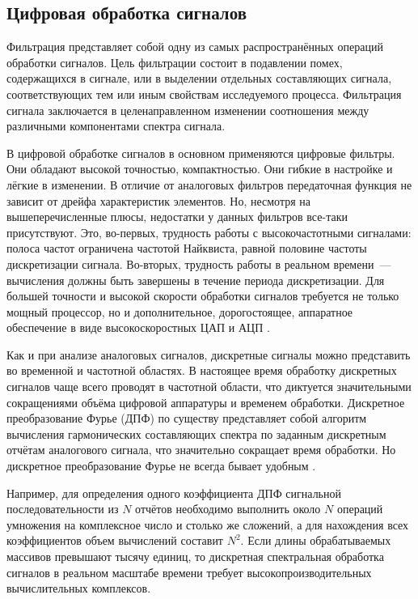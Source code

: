\documentclass[a4paper, 14pt, titlepage]{extarticle}
\begin{document}
  \subsection{Цифровая обработка сигналов}

  Фильтрация представляет собой одну из самых распространённых операций обработки сигналов. Цель
  фильтрации состоит в подавлении помех, содержащихся в сигнале, или в выделении отдельных
  составляющих сигнала, соответствующих тем или иным свойствам исследуемого процесса. Фильтрация
  сигнала заключается в целенаправленном изменении соотношения между различными компонентами спектра
  сигнала.

  В цифровой обработке сигналов в основном применяются цифровые фильтры. Они обладают высокой
  точностью, компактностью. Они гибкие в настройке и лёгкие в изменении. В отличие от аналоговых
  фильтров передаточная функция не зависит от дрейфа характеристик элементов. Но, несмотря на
  вышеперечисленные плюсы, недостатки у данных фильтров все-таки присутствуют. Это, во-первых, трудность работы с
  высокочастотными сигналами: полоса частот ограничена частотой Найквиста, равной половине частоты
  дискретизации сигнала. Во-вторых, трудность работы в реальном времени~--- вычисления должны быть завершены в
  течение периода дискретизации. Для большей точности и высокой скорости обработки сигналов
  требуется не только мощный процессор, но и дополнительное, дорогостоящее, аппаратное обеспечение в
  виде высокоскоростных ЦАП и АЦП \cite{glinchenko-digital}.

  Как и при анализе аналоговых сигналов, дискретные сигналы можно представить во временной и
  частотной областях. В настоящее время обработку дискретных сигналов чаще всего проводят в
  частотной области, что диктуется значительными сокращениями объёма цифровой аппаратуры и временем
  обработки. Дискретное преобразование Фурье (ДПФ) по существу представляет собой алгоритм вычисления
  гармонических составляющих спектра по заданным дискретным отчётам аналогового сигнала, что
  значительно сокращает время обработки.  Но дискретное преобразование Фурье не всегда бывает
  удобным \cite{solonina-algorithms}.

  Например, для определения одного коэффициента ДПФ сигнальной последовательности из $N$ отчётов
  необходимо выполнить около $N$ операций умножения на комплексное число и столько же сложений, а для
  нахождения всех коэффициентов объем вычислений составит $N^2$. Если длины обрабатываемых массивов
  превышают тысячу единиц, то дискретная спектральная обработка сигналов в реальном масштабе времени
  требует высокопроизводительных вычислительных комплексов.
\end{document}
